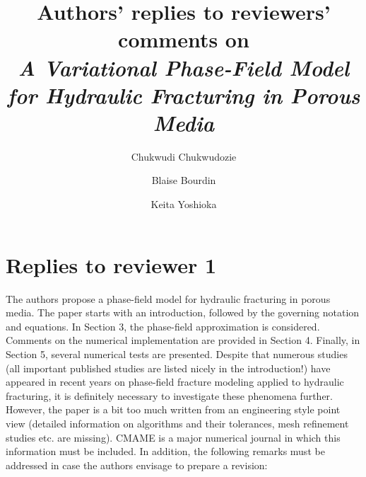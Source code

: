 \documentclass{article}
\title{Authors' replies to reviewers' comments on\\\textit{A Variational Phase-Field Model for Hydraulic Fracturing in Porous Media}}
\author{Chukwudi Chukwudozie \and Blaise Bourdin \and Keita Yoshioka}
\begin{document}
\maketitle

\section*{Replies to reviewer 1}
The authors propose a phase-field model for hydraulic fracturing in porous media.
The paper starts with an introduction, followed by the governing notation and equations. In Section 3, the phase-field approximation is considered. Comments on the numerical implementation are provided in Section 4. Finally, in Section 5, several numerical tests are presented.
Despite that numerous studies (all important published studies are listed nicely in the introduction!) have appeared in recent years on phase-field fracture modeling applied to hydraulic fracturing, it is definitely necessary to investigate these phenomena further.
However, the paper is a bit too much written from an engineering style point view (detailed information on algorithms and their tolerances, mesh refinement studies etc. are missing). CMAME is a major numerical journal in which this information must be included.
In addition, the following remarks must be addressed in case the authors envisage to prepare a revision:
\end{document}
